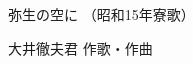 \documentclass[10pt,b5j]{tarticle} %
\begin{document}
\begin{minipage}[c]{0.7\hsize} %
    \begin{center}
        {\LARGE
            弥生の空に %
        }
        {\small 
            （昭和15年寮歌） %
        }
    \end{center}
\end{minipage}
\begin{minipage}[c]{0.3\hsize} %
    \begin{flushright} %
        大井徹夫君 作歌・作曲 %
    \end{flushright}
\end{minipage}
\end{document}
